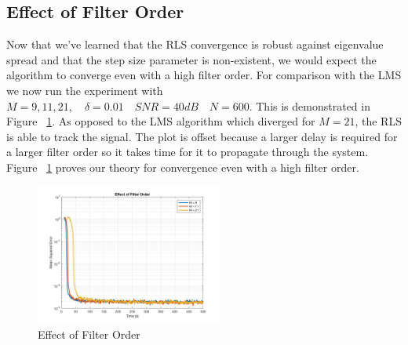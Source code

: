 \documentclass[journal]{IEEEtran}
\begin{document}
\subsection{Effect of Filter Order}
Now that we've learned that the RLS convergence is robust against eigenvalue spread
and that the step size parameter is non-existent, we would expect the algorithm to
converge even with a high filter order. For comparison with the LMS we now run the experiment with
$M = 9, 11, 21, \quad \delta = 0.01 \quad SNR = 40dB \quad N = 600$. This is demonstrated in Figure ~\ref{fig:filterorder2}.
As opposed to the LMS algorithm which diverged for $ M = 21$, the RLS is able to track the signal. The plot is offset because
a larger delay is required for a larger filter order so it takes time for it to propagate through the system. Figure ~\ref{fig:filterorder2}
proves our theory for convergence even with a high filter order.
\begin{figure}[H]
  \centering
  \captionsetup{justification=centering,font = small}
  \includegraphics[width=0.55\textwidth, inner] {Plots/Project2_filterorder.jpg}
  \caption{Effect of Filter Order}
    \label{fig:filterorder2}
\end{figure}
\end{document}
